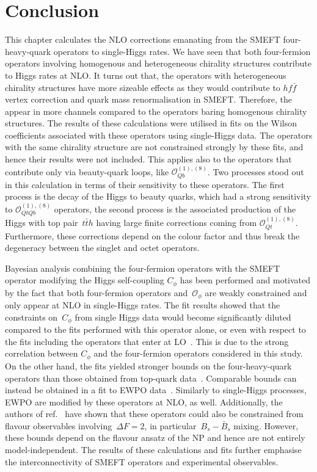 	\section{Conclusion \label{sec:conclusion4tops}}
\par 	This chapter calculates the NLO corrections emanating from the SMEFT four-heavy-quark operators to single-Higgs rates. We have seen that both four-fermion operators involving homogenous and heterogeneous chirality structures contribute to Higgs rates at NLO. It turns out that, the operators with heterogeneous chirality structures have more sizeable effects as they would contribute to $h f\bar f$ vertex correction and quark mass renormalisation in SMEFT. Therefore, the appear in more channels compared to the operators baring homogenous chirality structures. The results of these calculations were utilised in fits on the Wilson coefficients associated with these operators using single-Higgs data. The operators with the same chirality structure are not constrained strongly by these fits, and hence their results were not included. This applies also to the operators that contribute only via beauty-quark loops, like $\mathcal{O}_{Qb}^{(1),(8)}$. Two processes stood out in this calculation in terms of their sensitivity to these operators. The first process is the decay of the Higgs to beauty quarks, which had a strong sensitivity to $\mathcal{O}_{QtQb}^{(1),(8)}$ operators, the second process is the associated production of the Higgs with top pair~$t \bar th$ having large finite corrections coming from $\mathcal{O}_{Qt}^{(1),(8)}$. Furthermore, these corrections depend on the colour factor and thus break the degeneracy between the singlet and octet operators. 
\par	Bayesian analysis combining the four-fermion operators with the SMEFT operator modifying the Higgs self-coupling $C_\phi$ has been performed and motivated by the fact that both  four-fermion operators and~$\mathcal{O}_\phi$ are weakly constrained and only appear at NLO in single-Higgs rates. The fit results showed that the constraints on~$C_\phi$ from single Higgs data would become significantly diluted compared to the fits performed with this operator alone, or even with respect to the fits including the operators that  enter at LO~\cite{Gorbahn:2016uoy, Degrassi:2016wml, Bizon:2016wgr, Maltoni:2017ims, Degrassi:2021uik}. This is due to the strong correlation between $C_\phi$ and the four-fermion operators considered in this study. On the other hand, the fits yielded stronger bounds on the four-heavy-quark operators than those obtained from top-quark data~\cite{Ethier:2021bye, Hartland:2019bjb}. Comparable bounds can instead be obtained in a fit to EWPO data~\cite{Dawson:2022bxd}. Similarly to single-Higgs processes, EWPO are modified by these operators at NLO, as well. Additionally, the authors of ref.~\cite{Silvestrini:2018dos} have shown that these operators could also be constrained from flavour observables involving~$\Delta F=2$, in particular~$B_s -\bar{B}_s$ mixing. However, these bounds depend on the flavour ansatz of the NP and hence are not entirely model-independent. The results of these calculations and fits further emphasise the interconnectivity of SMEFT operators and experimental observables.
